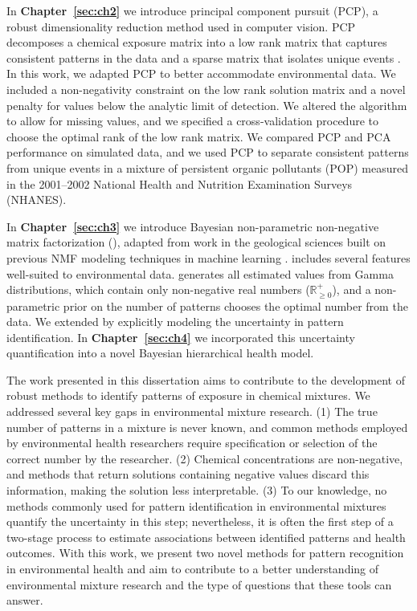 In \textbf{Chapter~\ref{sec:ch2}} we introduce principal component pursuit (PCP), a robust dimensionality reduction method used in computer vision. PCP decomposes a chemical exposure matrix into a low rank matrix that captures consistent patterns in the data and a sparse matrix that isolates unique events \cite{candes2011robust,zhou2010stable}. In this work, we adapted PCP to better accommodate environmental data. We included a non-negativity constraint on the low rank solution matrix and a novel penalty for values below the analytic limit of detection. We altered the algorithm to allow for missing values, and we specified a cross-validation procedure to choose the optimal rank of the low rank matrix. We compared PCP and PCA performance on simulated data, and we used PCP to separate consistent patterns from unique events in a mixture of persistent organic pollutants (POP) measured in the 2001--2002 National Health and Nutrition Examination Surveys (NHANES).

In \textbf{Chapter~\ref{sec:ch3}} we introduce Bayesian non-parametric non-negative matrix factorization (\bnmfc), adapted from work in the geological sciences built on previous NMF modeling techniques in machine learning \cite{holtzman2018machine, lee1999learning, cemgil2008bayesian, paisley2014bayesian}. \bnmf includes several features well-suited to environmental data. \bnmf generates all estimated values from Gamma distributions, which contain only non-negative real numbers ($\mathbb R_{\geq 0}^+$), and a non-parametric prior on the number of patterns chooses the optimal number from the data. We extended \bnmf by explicitly modeling the uncertainty in pattern identification. In \textbf{Chapter~\ref{sec:ch4}} we incorporated this uncertainty quantification into a novel Bayesian hierarchical health model. 

The work presented in this dissertation aims to contribute to the development of robust methods to identify patterns of exposure in chemical mixtures. We addressed several key gaps in environmental mixture research. (1) The true number of patterns in a mixture is never known, and common methods employed by environmental health researchers require specification or selection of the correct number by the researcher. (2) Chemical concentrations are non-negative, and methods that return solutions containing negative values discard this information, making the solution less interpretable. (3) To our knowledge, no methods commonly used for pattern identification in environmental mixtures quantify the uncertainty in this step; nevertheless, it is  often the first step of a two-stage process to estimate associations between identified patterns and health outcomes. With this work, we present two novel methods for pattern recognition in environmental health and aim to contribute to a better understanding of environmental mixture research and the type of questions that these tools can answer.

